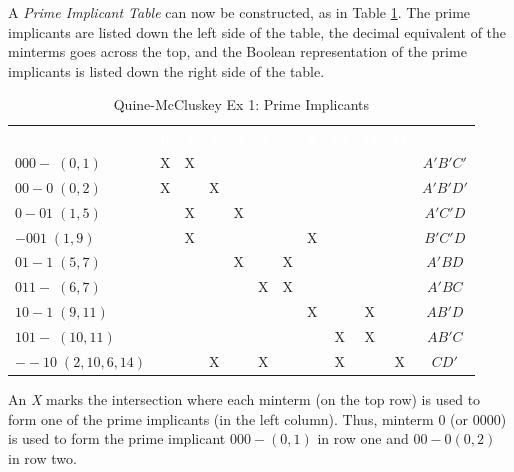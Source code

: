 A \emph{Prime Implicant Table} can now be constructed, as in Table \ref{ASM:tab:qm_ex_1_prime_implicants}. The prime implicants are listed down the left side of the table, the decimal equivalent of the minterms goes across the top, and the Boolean representation of the prime implicants is listed down the right side of the table. 

\begin{table}[H]
	\sffamily
	\newcommand{\head}[1]{\textcolor{white}{\textbf{#1}}}		
	\begin{center}
		\begin{adjustbox}{max width=\textwidth}
		\begin{tabular}{lccccccccccc} 
			\rowcolor{black!75}
			& \head{0} & \head{1} & \head{2} & \head{5}
			& \head{6} & \head{7} & \head{9} & \head{10}
			& \head{11} & \head{14} & \\
			$ 000-\;(0,1) $       & X & X &   &   &   &   &   &   &   &   & $ A'B'C' $ \\
			$ 00-0\;(0,2) $       & X &   & X &   &   &   &   &   &   &   & $ A'B'D' $ \\
			$ 0-01\;(1,5) $       &   & X &   & X &   &   &   &   &   &   & $ A'C'D $ \\
			$ -001\;(1,9) $       &   & X &   &   &   &   & X &   &   &   & $ B'C'D $ \\
			$ 01-1\;(5,7) $       &   &   &   & X &   & X &   &   &   &   & $ A'BD $ \\
			$ 011-\;(6,7) $       &   &   &   &   & X & X &   &   &   &   & $ A'BC $ \\
			$ 10-1\;(9,11) $      &   &   &   &   &   &   & X &   & X &   & $ AB'D $ \\
			$ 101-\;(10,11) $     &   &   &   &   &   &   &   & X & X &   & $ AB'C $ \\
			$ --10\;(2,10,6,14) $ &   &   & X &   & X &   &   & X &   & X & $ CD' $ \\
			\hline
		\end{tabular}
		\end{adjustbox}
	\end{center}
	\caption{Quine-McCluskey Ex 1: Prime Implicants}
  \label{ASM:tab:qm_ex_1_prime_implicants}
\end{table}

An \emph{X} marks the intersection where each minterm (on the top row) is used to form one of the prime implicants (in the left column). Thus, minterm $ 0 $ (or $ 0000 $) is used to form the prime implicant $ 000- (0,1) $ in row one and $ 00-0 (0,2) $ in row two. 

